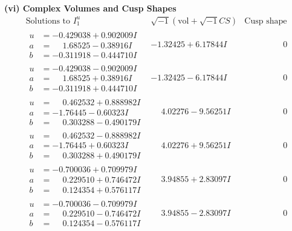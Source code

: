 \documentclass[1p]{elsarticle_modified}
\theoremstyle{definition}
\newcommand{\I}{\sqrt{-1}}
\begin{document}
\newpage\flushleft \textbf{(vi) Complex Volumes and Cusp Shapes}
$$\begin{array}{c|c|c}  
\text{Solutions to }I^u_{1}& \I (\text{vol} + \sqrt{-1}CS) & \text{Cusp shape}\\
 \hline 
\begin{aligned}
u &= -0.429038 + 0.902009 I \\
a &= \phantom{-}1.68525 - 0.38916 I \\
b &= -0.311918 - 0.444710 I\end{aligned}
 & -1.32425 + 6.17844 I & \phantom{-0.000000 } 0 \\ \hline\begin{aligned}
u &= -0.429038 - 0.902009 I \\
a &= \phantom{-}1.68525 + 0.38916 I \\
b &= -0.311918 + 0.444710 I\end{aligned}
 & -1.32425 - 6.17844 I & \phantom{-0.000000 } 0 \\ \hline\begin{aligned}
u &= \phantom{-}0.462532 + 0.888982 I \\
a &= -1.76445 - 0.60323 I \\
b &= \phantom{-}0.303288 - 0.490179 I\end{aligned}
 & \phantom{-}4.02276 - 9.56251 I & \phantom{-0.000000 } 0 \\ \hline\begin{aligned}
u &= \phantom{-}0.462532 - 0.888982 I \\
a &= -1.76445 + 0.60323 I \\
b &= \phantom{-}0.303288 + 0.490179 I\end{aligned}
 & \phantom{-}4.02276 + 9.56251 I & \phantom{-0.000000 } 0 \\ \hline\begin{aligned}
u &= -0.700036 + 0.709979 I \\
a &= \phantom{-}0.229510 + 0.746472 I \\
b &= \phantom{-}0.124354 + 0.576117 I\end{aligned}
 & \phantom{-}3.94855 + 2.83097 I & \phantom{-0.000000 } 0 \\ \hline\begin{aligned}
u &= -0.700036 - 0.709979 I \\
a &= \phantom{-}0.229510 - 0.746472 I \\
b &= \phantom{-}0.124354 - 0.576117 I\end{aligned}
 & \phantom{-}3.94855 - 2.83097 I & \phantom{-0.000000 } 0 \\ \hline\begin{aligned}

\end{aligned}
\end{array}$$
\end{document}
